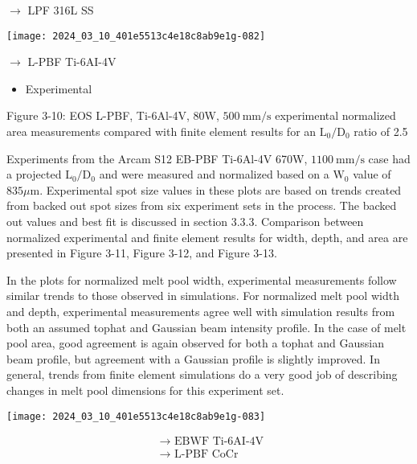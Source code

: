 \documentclass[10pt]{article}
\begin{document}
$\longrightarrow$ LPF 316L SS

\begin{center}
\texttt{[image: 2024\_03\_10\_401e5513c4e18c8ab9e1g-082]}
\end{center}

$\longrightarrow$ L-PBF Ti-6AI-4V

\begin{itemize}
  \item Experimental
\end{itemize}

Figure 3-10: EOS L-PBF, Ti-6Al-4V, 80W, $500 \mathrm{~mm} / \mathrm{s}$ experimental normalized area measurements compared with finite element results for an $\mathrm{L}_{0} / \mathrm{D}_{0}$ ratio of 2.5

Experiments from the Arcam S12 EB-PBF Ti-6Al-4V 670W, $1100 \mathrm{~mm} / \mathrm{s}$ case had a projected $\mathrm{L}_{0} / \mathrm{D}_{0}$ and were measured and normalized based on a $\mathrm{W}_{0}$ value of $835 \mu \mathrm{m}$. Experimental spot size values in these plots are based on trends created from backed out spot sizes from six experiment sets in the process. The backed out values and best fit is discussed in section 3.3.3. Comparison between normalized experimental and finite element results for width, depth, and area are presented in Figure 3-11, Figure 3-12, and Figure 3-13.

In the plots for normalized melt pool width, experimental measurements follow similar trends to those observed in simulations. For normalized melt pool width and depth, experimental measurements agree well with simulation results from both an assumed tophat and Gaussian beam intensity profile. In the case of melt pool area, good agreement is again observed for both a tophat and Gaussian beam profile, but agreement with a Gaussian profile is slightly improved. In general, trends from finite element simulations do a very good job of describing changes in melt pool dimensions for this experiment set.

\begin{center}
\texttt{[image: 2024\_03\_10\_401e5513c4e18c8ab9e1g-083]}
\end{center}

$$
\begin{aligned}
& \longrightarrow \text { EBWF Ti-6AI-4V } \\
& \longrightarrow \text { L-PBF CoCr }
\end{aligned}
$$
\end{document}

